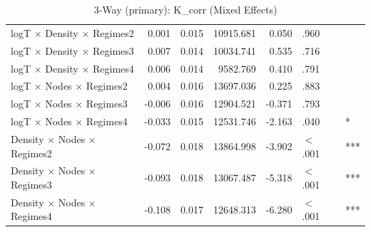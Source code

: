 \begin{table}[ht]
\begin{tabular}{lrrrrll}
  logT × Density × Regimes2 & 0.001 & 0.015 & 10915.681 & 0.050 & .960 &  \\ 
  logT × Density × Regimes3 & 0.007 & 0.014 & 10034.741 & 0.535 & .716 &  \\ 
  logT × Density × Regimes4 & 0.006 & 0.014 & 9582.769 & 0.410 & .791 &  \\ 
  logT × Nodes × Regimes2 & 0.004 & 0.016 & 13697.036 & 0.225 & .883 &  \\ 
  logT × Nodes × Regimes3 & -0.006 & 0.016 & 12904.521 & -0.371 & .793 &  \\ 
  logT × Nodes × Regimes4 & -0.033 & 0.015 & 12531.746 & -2.163 & .040 & * \\ 
  Density × Nodes × Regimes2 & -0.072 & 0.018 & 13864.998 & -3.902 & $<$ .001 & *** \\ 
  Density × Nodes × Regimes3 & -0.093 & 0.018 & 13067.487 & -5.318 & $<$ .001 & *** \\ 
  Density × Nodes × Regimes4 & -0.108 & 0.017 & 12648.313 & -6.280 & $<$ .001 & *** \\ 
   \hline
\end{tabular}
\caption{3-Way (primary): K_corr (Mixed Effects)} 
\end{table}
